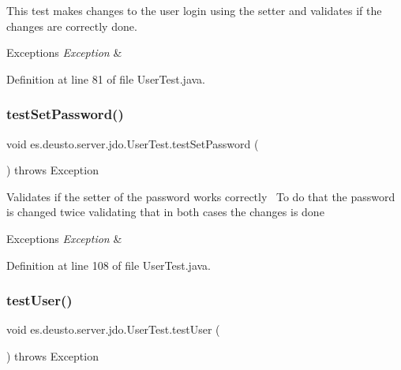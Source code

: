 This test makes changes to the user login using the setter and validates if the changes are correctly done. 
\begin{DoxyExceptions}{Exceptions}
{\em Exception} & \\
\hline
\end{DoxyExceptions}


Definition at line 81 of file User\+Test.\+java.

\mbox{\label{classes_1_1deusto_1_1server_1_1jdo_1_1_user_test_a03e1fab080aa109c4df4985c370934c8}} 
\subsubsection{\texorpdfstring{test\+Set\+Password()}{testSetPassword()}}
{\footnotesize\ttfamily void es.\+deusto.\+server.\+jdo.\+User\+Test.\+test\+Set\+Password (\begin{DoxyParamCaption}{ }\end{DoxyParamCaption}) throws Exception}

Validates if the setter of the password works correctly~\newline
To do that the password is changed twice validating that in both cases the changes is done 
\begin{DoxyExceptions}{Exceptions}
{\em Exception} & \\
\hline
\end{DoxyExceptions}


Definition at line 108 of file User\+Test.\+java.

\mbox{\label{classes_1_1deusto_1_1server_1_1jdo_1_1_user_test_a3e1ca2f6eb28866bbbf7568638f035e8}} 
\subsubsection{\texorpdfstring{test\+User()}{testUser()}}
{\footnotesize\ttfamily void es.\+deusto.\+server.\+jdo.\+User\+Test.\+test\+User (\begin{DoxyParamCaption}{ }\end{DoxyParamCaption}) throws Exception}

